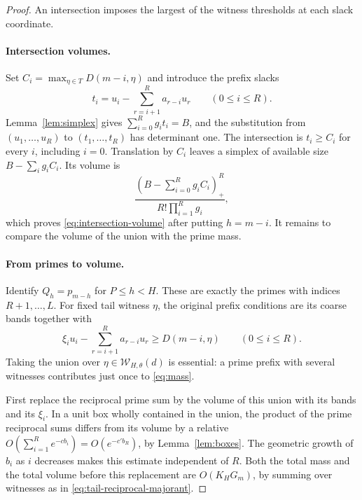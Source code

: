 \begin{proof}
An intersection imposes the largest of the witness thresholds at each
slack coordinate.

\paragraph{Intersection volumes.}
Set $C_i=\max_{\eta\in T}D(m-i,\eta)$ and introduce the prefix
slacks
\[
 t_i=u_i-\sum_{r=i+1}^Ra_{r-i}u_r\qquad(0\le i\le R).
\]
Lemma~\ref{lem:simplex} gives
$\sum_{i=0}^Rg_it_i=B$, and the substitution from
$(u_1,\ldots,u_R)$ to $(t_1,\ldots,t_R)$ has determinant one.
The intersection is $t_i\ge C_i$ for every $i$, including $i=0$.
Translation by $C_i$ leaves a simplex of available size
$B-\sum_i g_iC_i$. Its volume is
\[
 \frac{(B-\sum_{i=0}^Rg_iC_i)_+^R}
 {R!\prod_{i=1}^Rg_i},
\]
which proves \eqref{eq:intersection-volume} after putting $h=m-i$.
It remains to compare the volume of the union with the prime mass.

\paragraph{From primes to volume.}
Identify $Q_h=p_{m-h}$ for $P\le h<H$.  These are exactly the
primes with indices $R+1,\ldots,L$.  For fixed tail witness $\eta$,
the original prefix conditions are its coarse bands together with
\begin{equation}
 \xi_i u_i-\sum_{r=i+1}^Ra_{r-i}u_r\ge D(m-i,\eta)
 \qquad(0\le i\le R).
 \label{eq:perturbed-prefix-region}
\end{equation}
Taking the union over $\eta\in\mathcal W_{H,\theta}(d)$ is essential:
a prime prefix with several witnesses contributes just once to
\eqref{eq:mass}.

First replace the reciprocal prime sum by the volume of this union
with its bands and its $\xi_i$.  In a unit box wholly contained in
the union, the product of the prime reciprocal
sums differs from its volume by a relative
$O(\sum_{i=1}^R e^{-c b_i})=O(e^{-c' b_R})$, by
Lemma~\ref{lem:boxes}.  The geometric growth of $b_i$ as $i$
decreases makes this estimate independent of $R$.  Both the total
mass and the total volume before this replacement are
$O(K_HG_m)$, by summing over witnesses as in
\eqref{eq:tail-reciprocal-majorant}.


\end{proof}
